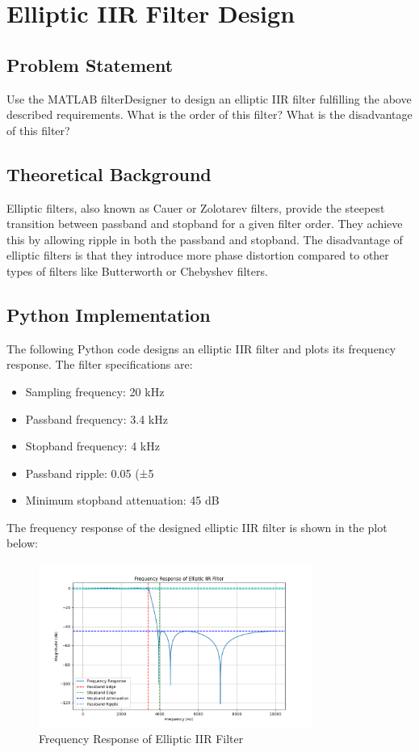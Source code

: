 \item[(h)]
\section{Elliptic IIR Filter Design}

\subsection*{Problem Statement}
Use the MATLAB filterDesigner to design an elliptic IIR filter fulfilling the above described requirements. What is the order of this filter? What is the disadvantage of this filter?

\subsection*{Theoretical Background}
Elliptic filters, also known as Cauer or Zolotarev filters, provide the steepest transition between passband and stopband for a given filter order. They achieve this by allowing ripple in both the passband and stopband. The disadvantage of elliptic filters is that they introduce more phase distortion compared to other types of filters like Butterworth or Chebyshev filters.

\subsection*{Python Implementation}
The following Python code designs an elliptic IIR filter and plots its frequency response. The filter specifications are:
\begin{itemize}
    \item Sampling frequency: 20 kHz
    \item Passband frequency: 3.4 kHz
    \item Stopband frequency: 4 kHz
    \item Passband ripple: 0.05 (±5%
    \item Minimum stopband attenuation: 45 dB
\end{itemize}

The frequency response of the designed elliptic IIR filter is shown in the plot below:

\begin{figure}[h]
    \centering
    \includegraphics[width=0.8\textwidth]{fig/ex4_h_frequency_response_elliptic.png}
    \caption{Frequency Response of Elliptic IIR Filter}
    \label{fig:ex4_h_frequency_response_elliptic}
\end{figure}

